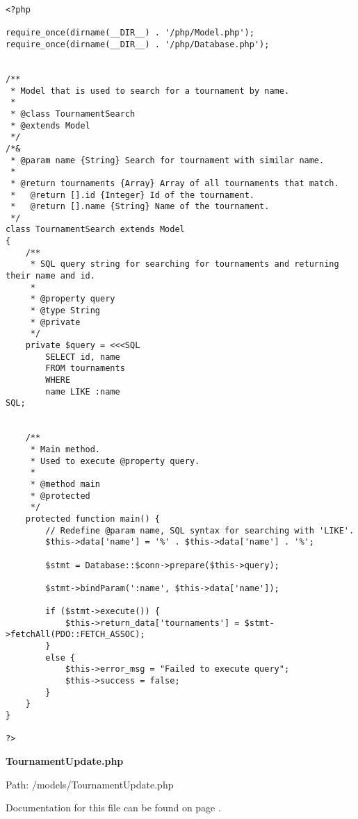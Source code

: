 {\scriptsize
\begin{lstlisting}
<?php

require_once(dirname(__DIR__) . '/php/Model.php');
require_once(dirname(__DIR__) . '/php/Database.php');


/**
 * Model that is used to search for a tournament by name.
 *
 * @class TournamentSearch
 * @extends Model
 */
/*&
 * @param name {String} Search for tournament with similar name.
 *
 * @return tournaments {Array} Array of all tournaments that match.
 *   @return [].id {Integer} Id of the tournament.
 *   @return [].name {String} Name of the tournament.
 */
class TournamentSearch extends Model
{
	/**
	 * SQL query string for searching for tournaments and returning their name and id.
	 *
	 * @property query
	 * @type String
	 * @private
	 */
	private $query = <<<SQL
		SELECT id, name
		FROM tournaments
		WHERE
		name LIKE :name
SQL;


	/**
	 * Main method.
	 * Used to execute @property query.
	 *
	 * @method main
	 * @protected
	 */
	protected function main() {
		// Redefine @param name, SQL syntax for searching with 'LIKE'.
		$this->data['name'] = '%' . $this->data['name'] . '%';

		$stmt = Database::$conn->prepare($this->query);

		$stmt->bindParam(':name', $this->data['name']);

		if ($stmt->execute()) {
			$this->return_data['tournaments'] = $stmt->fetchAll(PDO::FETCH_ASSOC);
		}
		else {
			$this->error_msg = "Failed to execute query";
			$this->success = false;
		}
	}
}

?>\end{lstlisting}
}
\textbf{TournamentUpdate.php}\label{TournamentUpdate.php}

Path: /models/TournamentUpdate.php

Documentation for this file can be found on page \pageref{TournamentUpdate.php.doc}.

